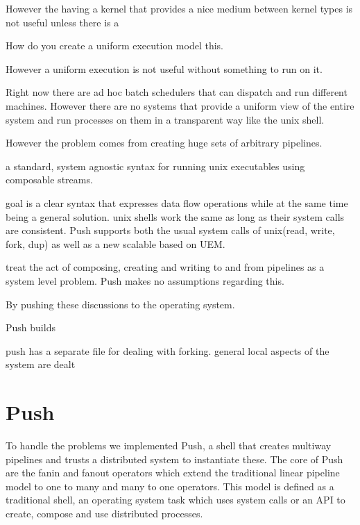 \documentclass{sig-alt-release2}
\begin{document}
However the having a kernel that provides a nice medium between kernel types is not useful unless there is a 

How do you create a uniform execution model this. 

However a uniform execution is not useful without something to run on it. 

Right now there are ad hoc batch schedulers that can dispatch and run different machines. However there are no systems that provide a uniform view of the entire system and run processes on them in a transparent way like the unix shell. 

However the problem comes from creating huge sets of arbitrary pipelines. 


a standard, system agnostic syntax for running unix executables using composable streams. 

goal is a clear syntax that expresses data flow operations while at the same time being a general solution. unix shells work the same as long as their system calls are consistent. Push supports both the usual system calls of unix(read, write, fork, dup) as well as a new scalable based on UEM. 

treat the act of composing, creating and writing to and from pipelines as a system level problem. Push makes no assumptions regarding this. 

By pushing these discussions to the operating system. 

Push builds 

push has a separate file for dealing with forking. general local aspects of the system are dealt 

\section{Push}
To handle the problems we implemented Push, a shell that creates multiway pipelines and trusts a distributed system to instantiate these. The core of Push are the fanin and fanout operators which extend the traditional linear pipeline model to one to many and many to one operators. This model is defined as a traditional shell, an operating system task which uses system calls or an API to create, compose and use distributed processes. 
\end{document}
